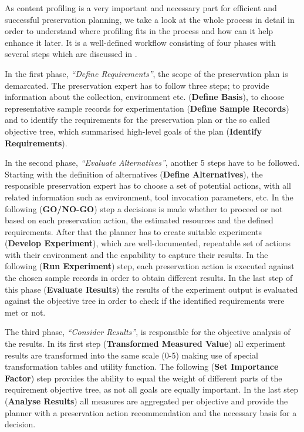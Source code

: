As content profiling is a very important and necessary part for efficient and successful preservation planning, we take a look at the whole process in detail in order to understand where profiling fits in the process and how can it help enhance it later. It is a well-defined workflow consisting of four phases with several steps which are discussed in \cite{STR07_jcdl}.

In the first phase, \textit{``Define Requirements''}, the scope of the preservation plan is demarcated. The preservation expert has to follow three steps; to provide information about the collection, environment etc. (\textbf{Define Basis}), to choose representative sample records for experimentation (\textbf{Define Sample Records}) and to identify the requirements for the preservation plan or the so called objective tree, which summarised high-level goals of the plan (\textbf{Identify Requirements}). 

In the second phase, \textit{``Evaluate Alternatives''}, another 5 steps have to be followed. Starting with the definition of alternatives (\textbf{Define Alternatives}), the responsible preservation expert has to choose a set of potential actions, with all related information such as environment, tool invocation parameters, etc. In the following (\textbf{GO/NO-GO}) step a decisions is made whether to proceed or not based on each preservation action, the estimated resources and the defined requirements. After that the planner has to create suitable experiments (\textbf{Develop Experiment}), which are well-documented, repeatable set of actions with their environment and the capability to capture their results. In the following (\textbf{Run Experiment}) step, each preservation action is executed against the chosen sample records in order to obtain different results. In the last step of this phase (\textbf{Evaluate Results}) the results of the experiment output is evaluated against the objective tree in order to check if the identified requirements were met or not.

The third phase, \textit{``Consider Results''}, is responsible for the objective analysis of the results. In its first step (\textbf{Transformed Measured Value}) all experiment results are transformed into the same scale (0-5) making use of special transformation tables and utility function. The following (\textbf{Set Importance Factor}) step provides the ability to equal the weight of different parts of the requirement objective tree, as not all goals are equally important. In the last step (\textbf{Analyse Results}) all measures are aggregated per objective and provide the planner with a preservation action recommendation and the necessary basis for a decision.

